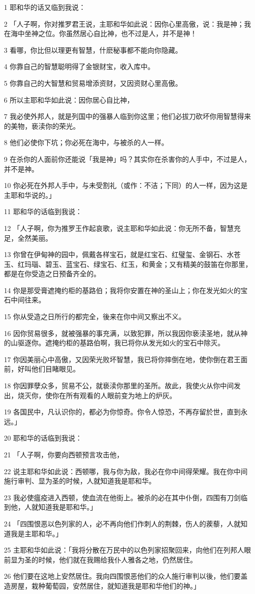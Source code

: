 \par 1 耶和华的话又临到我说：
\par 2 「人子啊，你对推罗君王说，主耶和华如此说：因你心里高傲，说：我是神；我在海中坐神之位。你虽然居心自比神，也不过是人，并不是神！
\par 3 看哪，你比但以理更有智慧，什麽秘事都不能向你隐藏。
\par 4 你靠自己的智慧聪明得了金银财宝，收入库中。
\par 5 你靠自己的大智慧和贸易增添资财，又因资财心里高傲。
\par 6 所以主耶和华如此说：因你居心自比神，
\par 7 我必使外邦人，就是列国中的强暴人临到你这里；他们必拔刀砍坏你用智慧得来的美物，亵渎你的荣光。
\par 8 他们必使你下坑；你必死在海中，与被杀的人一样。
\par 9 在杀你的人面前你还能说「我是神」吗？其实你在杀害你的人手中，不过是人，并不是神。
\par 10 你必死在外邦人手中，与未受割礼（或作：不洁；下同）的人一样，因为这是主耶和华说的。」
\par 11 耶和华的话临到我说：
\par 12 「人子啊，你为推罗王作起哀歌，说主耶和华如此说：你无所不备，智慧充足，全然美丽。
\par 13 你曾在伊甸神的园中，佩戴各样宝石，就是红宝石、红璧玺、金钢石、水苍玉、红玛瑙、碧玉、蓝宝石、绿宝石、红玉，和黄金；又有精美的鼓笛在你那里，都是在你受造之日预备齐全的。
\par 14 你是那受膏遮掩约柜的基路伯；我将你安置在神的圣山上；你在发光如火的宝石中间往来。
\par 15 你从受造之日所行的都完全，後来在你中间又察出不义。
\par 16 因你贸易很多，就被强暴的事充满，以致犯罪，所以我因你亵渎圣地，就从神的山驱逐你。遮掩约柜的基路伯啊，我已将你从发光如火的宝石中除灭。
\par 17 你因美丽心中高傲，又因荣光败坏智慧，我已将你摔倒在地，使你倒在君王面前，好叫他们目睹眼见。
\par 18 你因罪孽众多，贸易不公，就亵渎你那里的圣所。故此，我使火从你中间发出，烧灭你，使你在所有观看的人眼前变为地上的炉灰。
\par 19 各国民中，凡认识你的，都必为你惊奇。你令人惊恐，不再存留於世，直到永远。」
\par 20 耶和华的话临到我说：
\par 21 「人子啊，你要向西顿预言攻击他，
\par 22 说主耶和华如此说：西顿哪，我与你为敌，我必在你中间得荣耀。我在你中间施行审判、显为圣的时候，人就知道我是耶和华。
\par 23 我必使瘟疫进入西顿，使血流在他街上。被杀的必在其中仆倒，四围有刀剑临到他，人就知道我是耶和华。」
\par 24 「四围恨恶以色列家的人，必不再向他们作刺人的荆棘，伤人的蒺藜，人就知道我是主耶和华。」
\par 25 主耶和华如此说：「我将分散在万民中的以色列家招聚回来，向他们在列邦人眼前显为圣的时候，他们就在我赐给我仆人雅各之地，仍然居住。
\par 26 他们要在这地上安然居住。我向四围恨恶他们的众人施行审判以後，他们要盖造房屋，栽种葡萄园，安然居住，就知道我是耶和华他们的神。」

